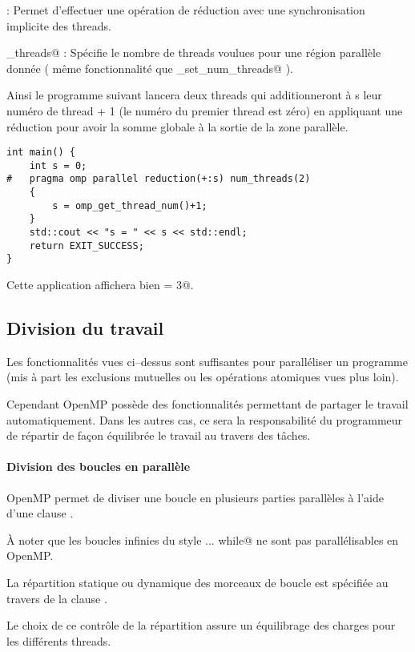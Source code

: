 \documentclass[fleqn,11pt]{article}
\begin{document}
\lstinline@reduction@ : Permet d'effectuer une opération de réduction avec une synchronisation implicite des threads.

\lstinline@num_threads@ : Spécifie le nombre de threads voulues pour une région parallèle donnée ( même fonctionnalité que \lstinline@omp_set_num_threads@ ).

Ainsi le programme suivant lancera deux threads qui additionneront à s leur numéro de thread + 1
(le numéro du premier thread est zéro) en appliquant une réduction pour avoir la somme globale à la
sortie de la zone parallèle.

\begin{lstlisting}
int main() {
    int s = 0;
#   pragma omp parallel reduction(+:s) num_threads(2)
    {
        s = omp_get_thread_num()+1;
    }
    std::cout << "s = " << s << std::endl;
    return EXIT_SUCCESS;
}
\end{lstlisting}

Cette application affichera bien \verb@s = 3@.

\subsection{Division du travail}

Les fonctionnalités vues ci--dessus sont suffisantes pour paralléliser un programme (mis à part
les exclusions mutuelles ou les opérations atomiques vues plus loin).

Cependant OpenMP possède des fonctionnalités permettant de partager le travail automatiquement.
Dans les autres cas, ce sera la responsabilité du programmeur de répartir de façon équilibrée le travail
au travers des tâches.

\paragraph{Division des boucles en parallèle}

OpenMP permet de diviser une boucle en plusieurs parties parallèles à l'aide d'une clause \verb@for@.

À noter que les boucles infinies du style \lstinline@do ... while@ ne sont pas parallélisables
en OpenMP.

La répartition statique ou dynamique des morceaux de boucle est spécifiée au travers de la clause
\verb@schedule@.

Le choix de ce contrôle de la répartition assure un équilibrage des charges pour les différents threads.
\end{document}
